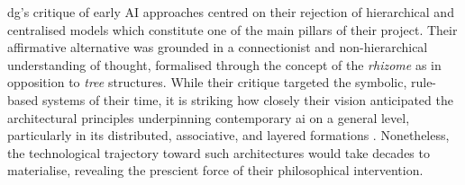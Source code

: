 \Gls{dg}’s critique of early AI approaches centred on their rejection of hierarchical and centralised models which constitute one of the main pillars of their project. Their affirmative alternative was grounded in a connectionist and non-hierarchical understanding of thought, formalised through the concept of the \textit{rhizome} \parencite[3ff.]{deleuze1987} as in opposition to \textit{tree} structures. While their critique targeted the symbolic, rule-based systems of their time, it is striking how closely their vision anticipated the architectural principles underpinning contemporary \gls{ai} on a general level, particularly in its distributed, associative, and layered formations
. Nonetheless, the technological trajectory toward such architectures would take decades to materialise, revealing the prescient force of their philosophical intervention.

